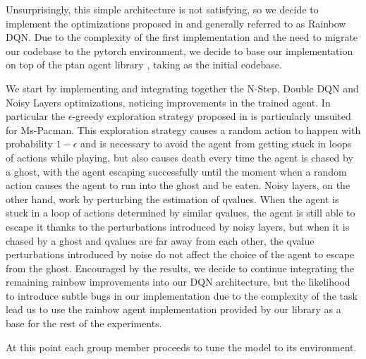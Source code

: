 \documentclass[10pt,twocolumn,letterpaper]{article}
\begin{document}
Unsurprisingly, this simple architecture is not satisfying, so we decide to implement the optimizations proposed in \cite{DBLP:journals/corr/abs-1710-02298} and generally referred to as Rainbow DQN. Due to the complexity of the first implementation and the need to migrate our codebase to the pytorch environment, we decide to base our implementation on top of the ptan agent library \cite{ptan}, taking \cite{packtrepo} as the initial codebase.

We start by implementing and integrating together the N-Step, Double DQN and Noisy Layers optimizations, noticing improvements in the trained agent. In particular the $\epsilon$-greedy exploration strategy proposed in \cite{DBLP:journals/corr/MnihKSGAWR13} is particularly unsuited for Ms-Pacman. This exploration strategy causes a random action to happen with probability $1 - \epsilon$ and is necessary to avoid the agent from getting stuck in loops of actions while playing, but also causes death every time the agent is chased by a ghost, with the agent escaping successfully until the moment when a random action causes the agent to run into the ghost and be eaten.
Noisy layers, on the other hand, work by perturbing the estimation of qvalues. When the agent is stuck in a loop of actions determined by similar qvalues, the agent is still able to escape it thanks to the perturbations introduced by noisy layers, but when it is chased by a ghost and qvalues are far away from each other, the qvalue perturbations introduced by noise do not affect the choice of the agent to escape from the ghost.
Encouraged by the results, we decide to continue integrating the remaining rainbow improvements into our DQN architecture, but the likelihood to introduce subtle bugs in our implementation due to the complexity of the task lead us to use the rainbow agent implementation provided by our library as a base for the rest of the experiments.

At this point each group member proceeds to tune the model to its environment.
\end{document}
